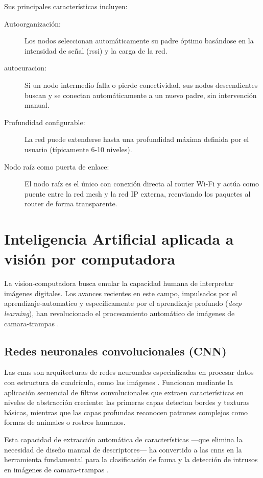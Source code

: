\documentclass[a4paper, 12pt]{report}
\begin{document}
Sus principales características incluyen:

\begin{description}
  \item[Autoorganización:] Los nodos seleccionan automáticamente su padre
    óptimo basándose en la intensidad de señal (\gls{rssi}) y la carga de la red.
  \item[\Gls{autocuracion}:] Si un nodo intermedio falla o pierde conectividad,
    sus nodos descendientes buscan y se conectan automáticamente a un
    nuevo padre, sin intervención manual.
  \item[Profundidad configurable:] La red puede extenderse hasta una
    profundidad máxima definida por el usuario (típicamente 6-10 niveles).
  \item[Nodo raíz como puerta de enlace:] El nodo raíz es el único con
    conexión directa al router Wi-Fi y actúa como puente entre la red
    mesh y la red IP externa, reenviando los paquetes al router de
    forma transparente.
\end{description}

\section{Inteligencia Artificial aplicada a visión por computadora}

La \gls{vision-computadora} busca emular la capacidad humana de interpretar
imágenes digitales. Los avances recientes en este campo, impulsados por el
\gls{aprendizaje-automatico} y específicamente por el aprendizaje profundo
(\textit{deep learning}), han revolucionado el procesamiento automático de
imágenes de \glspl{camara-trampa} \cite{norouzzadeh2018cameratrap}.

\subsection{Redes neuronales convolucionales (CNN)}

Las \glspl{cnn} son arquitecturas de redes neuronales especializadas en
procesar datos con estructura de cuadrícula, como las imágenes
\cite{goodfellow2016deep}. Funcionan mediante la aplicación secuencial de
filtros convolucionales que extraen características en niveles de abstracción
creciente: las primeras capas detectan bordes y texturas básicas, mientras
que las capas profundas reconocen patrones complejos como formas de animales
o rostros humanos.

Esta capacidad de extracción automática de características ---que elimina la
necesidad de diseño manual de descriptores--- ha convertido a las \glspl{cnn}
en la herramienta fundamental para la clasificación de fauna y la detección
de intrusos en imágenes de \glspl{camara-trampa} \cite{tabak2019machine}.
\end{document}
